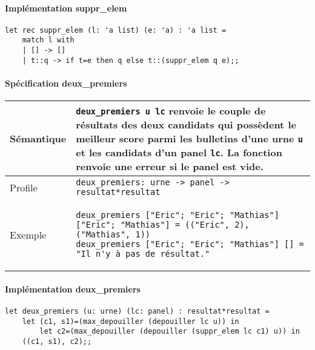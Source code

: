 \documentclass[french, 10pt, a4paper]{article}
\begin{document}
\paragraph{Implémentation suppr\_elem}

\begin{verbatim}
let rec suppr_elem (l: 'a list) (e: 'a) : 'a list =
	match l with
	| [] -> []
	| t::q -> if t=e then q else t::(suppr_elem q e);;
\end{verbatim}

\paragraph{Spécification deux\_premiers}

\begin{center}
	\begin{tabular}{|p{2cm}|p{\dimexpr\linewidth-2cm-4\tabcolsep-3\arrayrulewidth}|}
		\hline
		Sémantique
		&
		\texttt{deux_premiers u lc} renvoie le couple de résultats des deux candidats qui possèdent le meilleur score parmi les bulletins d'une urne \texttt{u} et les candidats d'un panel \texttt{lc}. La fonction renvoie une erreur si le panel est vide. %
%
		\\
		\hline
		Profile
		&
		\texttt{deux_premiers: urne -> panel -> resultat*resultat}
%
		\\
		\hline
		Exemple
		&
		\begin{verbatim}
deux_premiers ["Eric"; "Eric"; "Mathias"] ["Eric"; "Mathias"] = (("Eric", 2), ("Mathias", 1))
deux_premiers ["Eric"; "Eric"; "Mathias"] [] = "Il n'y à pas de résultat."
		\end{verbatim}
%
		\\
		\hline
	\end{tabular}
\end{center}

\paragraph{Implémentation deux\_premiers}

\begin{verbatim}
let deux_premiers (u: urne) (lc: panel) : resultat*resultat =
	let (c1, s1)=(max_depouiller (depouiller lc u)) in
		let c2=(max_depouiller (depouiller (suppr_elem lc c1) u)) in
	((c1, s1), c2);;
\end{verbatim}
\end{document}

